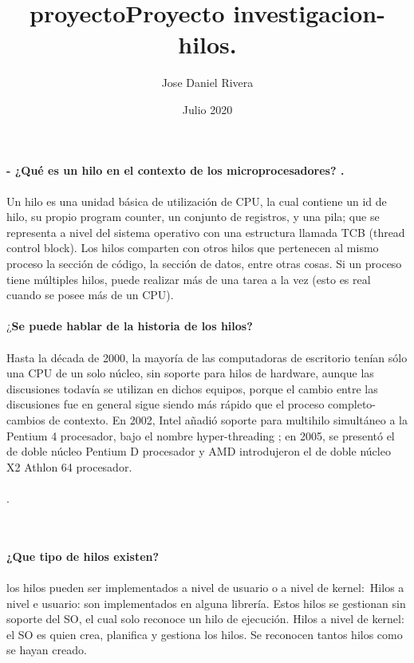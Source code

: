 \documentclass[12pt]{article}
\title{proyecto}
\author{Jose Daniel Rivera }
\date{Julio 2020}
\begin{document}
\title{Proyecto investigacion-hilos. \\}

\maketitle

\noindent
\textbf{- ¿Qué es un hilo en el contexto de los microprocesadores? .}
\\
\noindent
\\
Un hilo es una unidad básica de utilización de CPU, la cual contiene un id de hilo, su propio program counter, un conjunto de registros, y una pila; que se representa a nivel del sistema operativo con una estructura llamada TCB (thread control block). Los hilos comparten con otros hilos que pertenecen al mismo proceso la sección de código, la sección de datos, entre otras cosas. Si un proceso tiene múltiples hilos, puede realizar más de una tarea a la vez (esto es real cuando se posee más de un CPU). \\
\noindent
\\
\textbf{}¿\textbf{Se puede hablar de la historia de los hilos?}\\
\noindent
\\
Hasta la década de 2000, la mayoría de las computadoras de escritorio tenían sólo una CPU de un solo núcleo, sin soporte para hilos de hardware, aunque las discusiones todavía se utilizan en dichos equipos, porque el cambio entre las discusiones fue en general sigue siendo más rápido que el proceso completo- cambios de contexto. En 2002, Intel añadió soporte para multihilo simultáneo a la Pentium 4 procesador, bajo el nombre hyper-threading ; en 2005, se presentó el de doble núcleo Pentium D procesador y AMD introdujeron el de doble núcleo X2 Athlon 64 procesador.\cite{costaintegracion2010}\\
\\
.

\noindent\\
\\
\textbf{¿Que tipo de hilos existen?}\\
\\
los hilos pueden ser implementados a nivel de usuario o a nivel de kernel:\
Hilos a nivel e usuario: son implementados en alguna librería. Estos hilos se gestionan sin soporte del SO, el cual solo reconoce un hilo de ejecución. 
Hilos a nivel de kernel: el SO es quien crea, planifica y gestiona los hilos. Se reconocen tantos hilos como se hayan creado.  \cite{llavensistemas2015}
\end{document}
